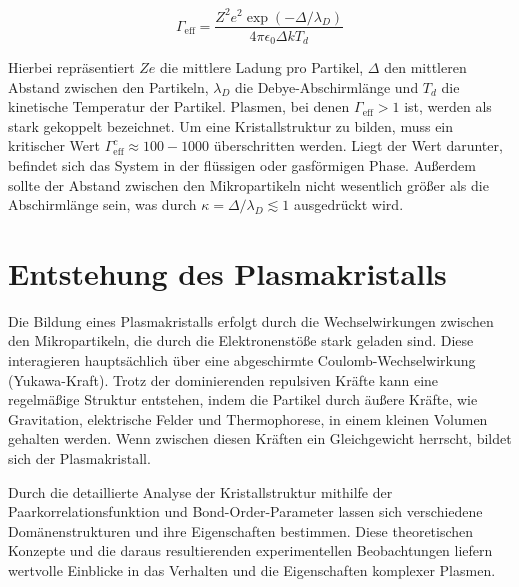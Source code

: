 \documentclass[12pt,a4paper,ngerman]{report}
\begin{document}
\[ \Gamma_{\text{eff}} = \frac{Z^2 e^2 \exp(-\Delta/\lambda_D)}{4 \pi \epsilon_0 \Delta kT_d} \]

Hierbei repräsentiert \(Ze\) die mittlere Ladung pro Partikel, \( \Delta \) den mittleren Abstand zwischen den Partikeln, \( \lambda_D \) die Debye-Abschirmlänge und \( T_d \) die kinetische Temperatur der Partikel. Plasmen, bei denen \( \Gamma_{\text{eff}} > 1 \) ist, werden als stark gekoppelt bezeichnet. Um eine Kristallstruktur zu bilden, muss ein kritischer Wert \( \Gamma_{\text{eff}}^c \approx 100 - 1000 \) überschritten werden. Liegt der Wert darunter, befindet sich das System in der flüssigen oder gasförmigen Phase. Außerdem sollte der Abstand zwischen den Mikropartikeln nicht wesentlich größer als die Abschirmlänge sein, was durch \( \kappa = \Delta/\lambda_D \lesssim 1 \) ausgedrückt wird.




\section{Entstehung des Plasmakristalls}
Die Bildung eines Plasmakristalls erfolgt durch die Wechselwirkungen zwischen den Mikropartikeln, die durch die Elektronenstöße stark geladen sind. Diese interagieren hauptsächlich über eine abgeschirmte Coulomb-Wechselwirkung (Yukawa-Kraft). Trotz der dominierenden repulsiven Kräfte kann eine regelmäßige Struktur entstehen, indem die Partikel durch äußere Kräfte, wie Gravitation, elektrische Felder und Thermophorese, in einem kleinen Volumen gehalten werden. Wenn zwischen diesen Kräften ein Gleichgewicht herrscht, bildet sich der Plasmakristall.

Durch die detaillierte Analyse der Kristallstruktur mithilfe der Paarkorrelationsfunktion und Bond-Order-Parameter lassen sich verschiedene Domänenstrukturen und ihre Eigenschaften bestimmen. Diese theoretischen Konzepte und die daraus resultierenden experimentellen Beobachtungen liefern wertvolle Einblicke in das Verhalten und die Eigenschaften komplexer Plasmen.
\end{document}
